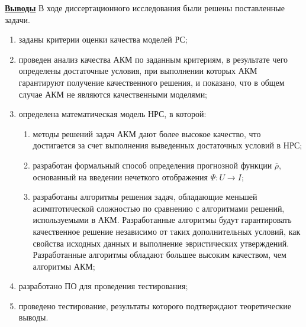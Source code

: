 \documentclass[a4paper,14pt]{report}
\newcommand{\rh}{\overline{\rho}}
\theoremstyle{plain}
\theoremstyle{break}
\begin{document}
\underline{\bf Выводы}
В ходе диссертационного исследования были решены поставленные задачи.
\begin{enumerate}
	\item заданы критерии оценки качества моделей РС;
	\item проведен анализ качества АКМ по
		заданным критериям, в результате чего определены достаточные условия, при
		выполнении которых АКМ гарантируют получение
		качественного решения, и показано, что в общем
		случае АКМ не являются качественными моделями;
	\item определена математическая модель НРС, в которой:
		\begin{enumerate}
			\item методы решений задач АКМ дают более высокое качество,
				что достигается за счет выполнения выведенных
				достаточных условий в НРС;

			\item разработан формальный способ определения прогнозной функции
				$\rh$, основанный на введении нечеткого отображения
				$\Psi: U \rightarrow I$;

			\item разработаны алгоритмы решения задач, обладающие меньшей
				асимптотической сложностью по сравнению с алгоритмами
				решений, используемыми в АКМ.
				Разработанные алгоритмы будут гарантировать качественное
				решение независимо от таких дополнительных условий,
				как свойства исходных данных и выполнение
				эвристических утверждений. Разработанные алгоритмы обладают
				большее высоким качеством, чем алгоритмы
				АКМ;

		\end{enumerate}
	\item разработано ПО для проведения тестирования;
	\item проведено тестирование, результаты которого подтверждают
		теоретические выводы.
\end{enumerate}
\end{document}
